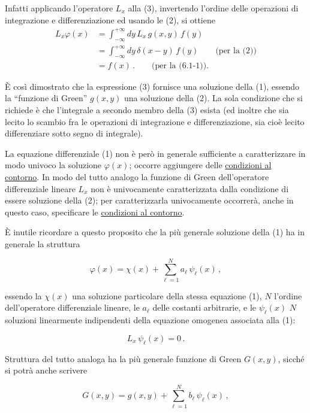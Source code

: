 \documentclass[11pt, a4paper]{book}
\numberwithin{equation}{section}
\begin{document}
Infatti applicando l'operatore $L_x$ alla (3), invertendo l'ordine delle operazioni di integrazione e differenziazione ed usando le (2), si ottiene
\begin{align*}
    L_x \varphi(x) &= \int_{-\infty}^{+\infty} dy \, L_x \, g(x,y) \, f(y) \\
                   &= \int_{-\infty}^{+\infty} dy \, \delta(x-y) \, f(y) \qquad \text{(per la (2))} \\
                   &= f(x) \,. \qquad \text{(per la (6.1-1))}.
\end{align*}

È così dimostrato che la espressione (3) fornisce una soluzione della (1), essendo la ``funzione di Green'' $g(x,y)$ una soluzione della (2). La sola condizione che si richiede è che l'integrale a secondo membro della (3) esista (ed inoltre che sia lecito lo scambio fra le operazioni di integrazione e differenziazione, sia cioè lecito differenziare sotto segno di integrale).

La equazione differenziale (1) non è però in generale sufficiente a caratterizzare in modo univoco la soluzione $\varphi(x)$; occorre aggiungere delle \underline{condizioni al contorno}. In modo del tutto analogo la funzione di Green dell'operatore differenziale lineare $L_x$ non è univocamente caratterizzata dalla condizione di essere soluzione della (2); per caratterizzarla univocamente occorrerà, anche in questo caso, specificare le \underline{condizioni al contorno}.

È inutile ricordare a questo proposito che la più generale soluzione della (1) ha in generale la struttura

\begin{equation}
    \varphi(x) = \chi(x) + \sum_{\ell=1}^{N} a_\ell \, \psi_\ell(x) \,,
\end{equation}

essendo la $\chi(x)$ una soluzione particolare della stessa equazione (1), $N$ l'ordine dell'operatore differenziale lineare, le $a_\ell$ delle costanti arbitrarie, e le $\psi_\ell(x)$ $N$ soluzioni linearmente indipendenti della equazione omogenea associata alla (1):

\begin{equation}
    L_x \, \psi_\ell(x) = 0 \,.
\end{equation}

Struttura del tutto analoga ha la più generale funzione di Green $G(x,y)$, sicché si potrà anche scrivere

\begin{equation}
    G(x,y) = g(x,y) + \sum_{\ell=1}^{N} b_\ell \, \psi_\ell(x) \,,
\end{equation}
\end{document}
